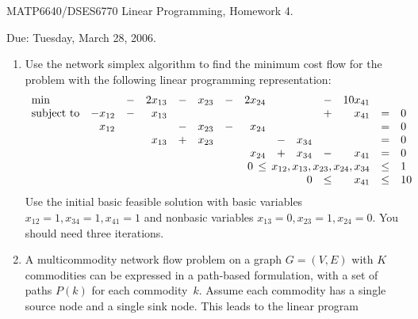 \documentclass[12pt]{article}
\begin{document}
\begin{center}
  \begin{large}
     MATP6640/DSES6770 Linear Programming, Homework 4.
  \end{large}
\end{center}

\begin{flushright}
   Due:  Tuesday, March 28, 2006.
\end{flushright}



\begin{enumerate}
\item
Use the network simplex algorithm to find the minimum cost flow for the problem
with
the following linear programming representation:
\begin{displaymath}
\begin{array}{lrcrcrcrcrcrcl}
\min & & - & 2x_{13}& - & x_{23} & - & 2x_{24} &&& - & 10 x_{41} \\
\mbox{subject to} & -x_{12} & - & x_{13} &&&&&&& + & x_{41} & = & 0 \\
& x_{12} &&& - & x_{23} & - & x_{24} &&&&& = & 0 \\
&&& x_{13} & + & x_{23} &&& - & x_{34} &&& = & 0 \\
&&&&&&& x_{24} & + & x_{34} & - & x_{41} & = & 0 \\
& \multicolumn{11}{r}{0 \, \leq \, x_{12}, x_{13}, x_{23}, x_{24}, x_{34}}
& \leq & 1 \\
&&&&&&&&& 0 & \leq & x_{41} & \leq & 10
\end{array}
\end{displaymath}
Use the initial basic feasible solution with basic variables
$ %
x_{12} = 1, x_{34}=1, x_{41}=1
$ %
and nonbasic variables
$ %
x_{13}=0, x_{23}=1, x_{24}=0.
$ %
You should need three iterations.
\item   \label{q.multiform}
A multicommodity network flow problem on a graph $G=(V,E)$ with $K$ commodities
can be expressed in a path-based formulation, with a set of paths $P(k)$
for each commodity~$k$.
Assume each commodity has a single source node and a single sink node.
This leads to the linear program
\begin{displaymath}
\begin{array}{lrcll}

\end{array}
\end{displaymath}
\end{enumerate}
\end{document}
